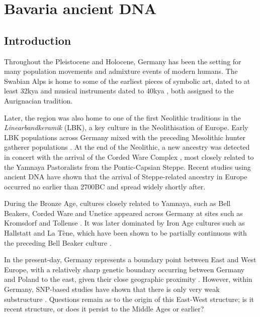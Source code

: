 \chapter{Bavaria ancient DNA}
\label{chapterlabel4}

\section{Introduction}

Throughout the Pleistocene and Holocene, Germany has been the setting for many population movements and admixture events of modern humans. The Swabian Alps is home to some of the earliest pieces of symbolic art, dated to at least 32kya \cite{conard2009female} and musical instruments dated to 40kya \cite{conard2009new}, both assigned to the Aurignacian tradition. 

Later, the region was also home to one of the first Neolithic traditions in the \textit{Linearbandkeramik} (LBK), a key culture in the Neolithisation of Europe. Early LBK populations across Germany mixed with the preceding Mesolithic hunter gatherer populations \cite{Lipson2017b, mathieson2015genome, Haak2015,gunther2015ancient, Hofmanova2016}. At the end of the Neolithic, a new ancestry was detected \cite{Haak2015, Allentoft2015}  in concert with the arrival of the Corded Ware Complex \cite{furholt2003absolutchronologische}, most closely related to the Yamnaya Pastoralists from the Pontic-Capsian Steppe. Recent studies using ancient DNA have shown that the arrival of Steppe-related ancestry in Europe occurred no earlier than 2700BC \cite{furtwangler2020ancient} and spread widely shortly after.

During the Bronze Age, cultures closely related to Yamnaya, such as Bell Beakers, Corded Ware and Unetice \cite{Haak2015} appeared across Germany at sites such as Kromsdorf \cite{lee2012emerging} and Tollense \cite{jantzen2011bronze, brinker2013human}. It was later dominated by Iron Age cultures such as Hallstatt and La Tène, which have been shown to be partially continuous with the preceding Bell Beaker culture \cite{Brunel12791}. 
 
In the present-day, Germany represents a boundary point between East and West Europe, with a relatively sharp genetic boundary occurring between Germany and Poland to the east, given their close geographic proximity \cite{novembre2008genes, kayser2005significant, veeramah2011genetic}. However, within Germany, SNP-based studies have shown that there is only very weak substructure \cite{steffens2006snp}. Questions remain as to the origin of this East-West structure; is it recent structure, or does it persist to the Middle Ages or earlier? 


